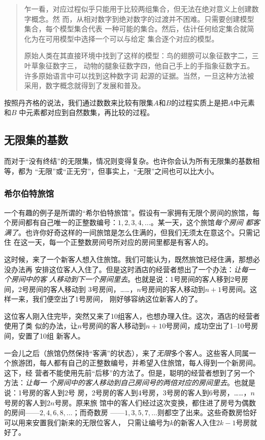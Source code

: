 \begin{quotation}
    乍一看，对应过程似乎只能用于比较两组集合，但无法在绝对意义上创建数字概念。然
    而，从相对数字到绝对数字的过渡并不困难。只需要创建模型集合，每个模型集合代表
    一种可能的集合。然后，估计任何给定集合就简化为在可用模型中选择一个可以与给定
    集合逐个对应的模型。

    原始人类在其直接环境中找到了这样的模型：鸟的翅膀可以象征数字二，三叶草象征数字三，
    动物的腿象征数字四，他自己手上的手指象征数字五。许多原始语言中可以找到这种数字词
    起源的证据。当然，一旦这种方法被采用，数字概念就得到了发展和普及。
\end{quotation}

按照丹齐格的说法，我们通过数数来比较有限集$A$和$B$的过程实质上是把$A$中元素和$B$
中元素都对应到自然数集，再比较的过程。

\subsection{无限集的基数}

而对于“没有终结”的无限集，情况则变得复杂。也许你会认为所有无限集的基数相等，都为
“无限”或“正无穷”，但事实上，“无限”之间也可以比大小。

\subsubsection{希尔伯特旅馆}

一个有趣的例子是所谓的“希尔伯特旅馆”。假设有一家拥有无限个房间的旅馆，每
个房间都有自己唯一的正整数编号：$1,2,3,4,\ldots $。某一天，这个旅馆\emph{每个房间
都客满了}。也许你好奇这样的一间旅馆是怎么住满的，但我们无须太在意这个。只需记住
在这一天，每一个正整数房间号所对应的房间里都是有客人的。

这时候，来了一个新客人想入住旅馆。我们可能认为，既然旅馆已经住满，那想必没办法再
安排这位客人入住了。但是这时酒店的经营者想出了一个办法：\emph{让每一个房间中的客
人移动到下一个房间里去}。也就是说：1号房间的客人移到2号房间，2号房间的客人移动到
3号房间，……，$n$号房间的客人移动到$n+1$号房间。这样一来，我们便空出了1号房间，
刚好够容纳这位新客人的了。

这位客人刚入住完毕，突然又来了10组客人，也想办理入住。这次，酒店的经营者使用了类
似的办法，让$n$号房间的客人移动到$n+10$号房间，成功空出了1--10号房间，安置了10组
新客人。

一会儿之后（旅馆仍然保持“客满”的状态），来了\emph{无限}多个客人。这些客人同属一
个旅游团，每人都有自己的正整数编号，并希望入住旅馆，每人得到一个新房间。这下，经
营者不能使用先前“后移”的方法了。但是，聪明的经营者想到了另一个方法：\emph{让每一
个房间中的客人移动到自己房间号的两倍对应的房间里去}。也就是说：1号房的客人到2号
房，2号房的客人到4号房，3号房的客人到6号房，……，$n$号房的客人到$2n$号房。原来旅
馆中的客人们经过这次变换，都住进了房号为偶数的房间——$2,4,6,8,\ldots $；而奇数房
——$1,3,5,7,\ldots $则都空了出来。这些奇数房恰好可以用来安置我们新来的无限位客人，
只需让编号为$k$的新客人入住$2k-1$号房就好了。

